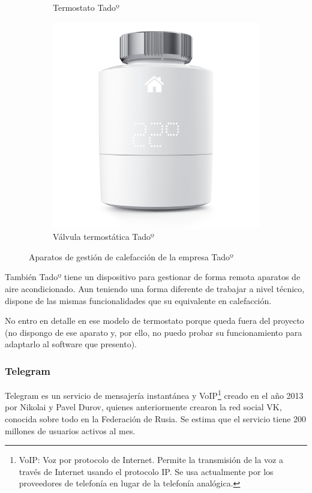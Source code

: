 \documentclass[spanish,12pt, a4paper, twoside]{paper}
\begin{document}
\begin{figure}[htp]
\begin{subfigure}{0.5\textwidth}
\caption{Termostato Tadoº}
\label{fig:termostato tado}
\end{subfigure}
\begin{subfigure}{0.5\textwidth}
\includegraphics[width=\textwidth]{recursos/valvula.jpeg}
\caption{Válvula termostática Tadoº}
\label{fig:valvula tado}
\end{subfigure}

\caption{Aparatos de gestión de calefacción de la empresa Tadoº}
\label{fig:aparatos tado}
\end{figure}

También Tadoº tiene un dispositivo para gestionar de forma remota aparatos de aire acondicionado. Aun teniendo una forma diferente de trabajar a nivel técnico, dispone de las mismas funcionalidades que su equivalente en calefacción.

No entro en detalle en ese modelo de termostato porque queda fuera del proyecto (no dispongo de ese aparato y, por ello, no puedo probar su funcionamiento para adaptarlo al software que presento).

\subsubsection{Telegram}

Telegram es un servicio de mensajería instantánea y VoIP\footnote{VoIP: Voz por protocolo de Internet. Permite la transmisión de la voz a través de Internet usando el protocolo IP. Se usa actualmente por los proveedores de telefonía en lugar de la telefonía analógica.} creado en el año 2013 por Nikolai y Pavel Durov, quienes anteriormente crearon la red social VK, conocida sobre todo en la Federación de Rusia. Se estima que el servicio tiene 200 millones de usuarios activos al mes.
\end{document}
